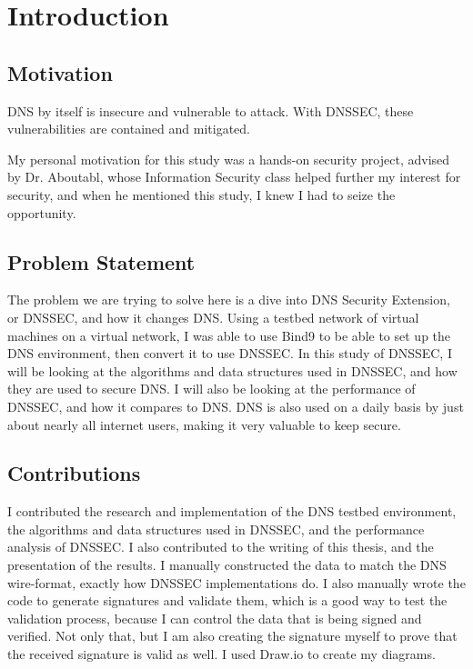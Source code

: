 \chapter{Introduction}

\section{Motivation}
    DNS by itself is insecure and vulnerable to attack. With DNSSEC, these vulnerabilities are contained and mitigated.

    My personal motivation for this study was a hands-on security project, advised by Dr. Aboutabl, whose Information Security class helped 
further my interest for security, and when he mentioned this study, I knew I had to seize the opportunity.


\section{Problem Statement}
The problem we are trying to solve here is a dive into DNS Security Extension, or DNSSEC, and how it changes DNS. Using a testbed network 
of virtual machines on a virtual network, I was able to use Bind9 to be able to set up the DNS environment, then convert it to use DNSSEC. 
In this study of DNSSEC, I will be looking at the algorithms and data structures used in DNSSEC, and how they are used to secure DNS. I will 
also be looking at the performance of DNSSEC, and how it compares to DNS. DNS is also used on a daily basis by just about nearly all internet users, 
making it very valuable to keep secure.


\section{Contributions}

I contributed the research and implementation of the DNS testbed environment, the algorithms and data structures used in DNSSEC, and the performance 
analysis of DNSSEC. I also contributed to the writing of this thesis, and the presentation of the results. I manually constructed the data to match the DNS wire-format, exactly how 
DNSSEC implementations do. I also manually wrote the code to generate 
signatures and validate them, which is a good way to test the validation process, because I can control the data that is being signed and verified. Not 
only that, but I am also creating the signature myself to prove that the received signature is valid as well. I used Draw.io to create my diagrams.

